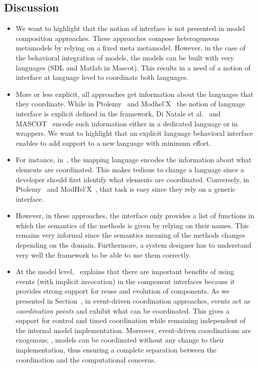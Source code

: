 	\subsection{Discussion}
	\begin{itemize}
			\item We want to highlight that the notion of interface is not presented in model composition approaches. These approaches compose heterogeneous metamodels by relying on a fixed meta metamodel. However, in the case of the behavioral integration of models, the models can be built with very languages (\eg SDL and Matlab in Mascot). This results in a need of a notion of interface at language level to coordinate both languages.   
			
			\item More or less explicit, all approaches get information about the languages that they coordinate. While in Ptolemy~\cite{ptoleframebib} and Modhel'X~\cite{modhelxbib} the notion of language interface is explicit defined in the framework, Di Natale et al.~\cite{dinatale} and MASCOT~\cite{mascotbib} encode such information either in a dedicated language or in wrappers. We want to highlight that an explicit language behavioral interface enables to add support to a new language with minimum effort.
			\item For instance, in~\cite{dinatale}, the mapping language encodes the information about what elements are coordinated. This makes tedious to change a language since a developer should first identify what elements are coordinated. Conversely, in Ptolemy~\cite{ptoleframebib} and ModHel'X~\cite{modhelxbib}, that task is easy since they rely on a generic interface. 
			\item However, in these approaches, the interface only provides a list of functions in which the semantics of the methods is given by relying on their names. This remains very informal since the semantics meaning of the methods changes depending on the domain. Furthermore, a system designer has to understand very well the framework to be able to use them correctly.     
			
	    	\item At the model level,~\cite{garlansoftarchbib} explains that there are important benefits of using events (with implicit invocation) in the component interfaces because it provides strong support for reuse and evolution of components. As we presented in Section~\cite{background}, in event-driven coordination approaches, events act as \emph{coordination points} and exhibit what can be coordinated. This gives a support for control and timed coordination while remaining independent of the internal model
	    	implementation. Moreover, event-driven coordinations are exogenous; \ie, models can be coordinated without any change to their implementation, thus ensuring a complete separation between the coordination and the computational concerns.
	 	

\end{itemize}
